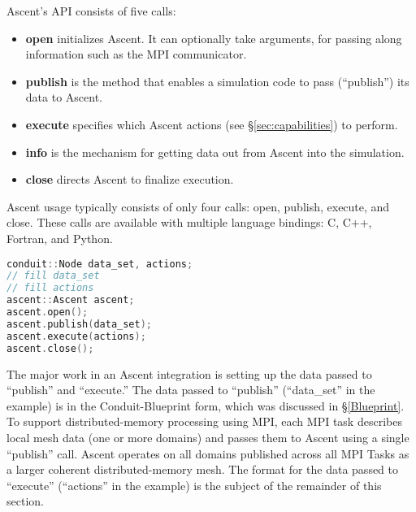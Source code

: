 %

Ascent's API consists of five calls:
%
\begin{itemize}
  \item \textbf{open} initializes Ascent.  It can optionally take arguments, for passing along
information such as the MPI communicator.
%
  \item \textbf{publish} is the method that enables a simulation code to pass (``publish'') its data
to Ascent.  
%
   \item \textbf{execute} specifies which Ascent actions (see \S\ref{sec:capabilities}) to perform.  
%
%
  \item \textbf{info} is the mechanism for getting data out from Ascent into the simulation.
%
%
  \item \textbf{close} directs Ascent to finalize execution.
\end{itemize}

Ascent usage typically consists of only four calls: open, publish, execute, and close.
%
These calls are available with multiple language bindings: C, C++, Fortran, and Python.
%
%
\begin{lstlisting}[language=C++,caption={\label{listing:ascent_api}Typical Ascent usage in C++.
The code for ``fill data\_set'' can be found in Listing~\ref{ex:blueprint}, while the code
for ``fill actions'' can be found in Listing~\ref{listing:actions}.}]
conduit::Node data_set, actions;
// fill data_set 
// fill actions 
ascent::Ascent ascent;
ascent.open();
ascent.publish(data_set);
ascent.execute(actions);
ascent.close();
\end{lstlisting}

The major work in an Ascent integration is setting up the data passed to ``publish'' and
``execute.''
%
The data passed to ``publish'' (``data\_set'' in the example) is in the Conduit-Blueprint form, which was discussed in \S\ref{Blueprint}. To support distributed-memory processing using MPI, each MPI task describes local mesh data (one or more domains) and passes them to Ascent using a single ``publish'' call. Ascent operates on all domains published across all MPI Tasks as a larger coherent distributed-memory mesh. 
%
The format for the data passed to ``execute'' (``actions'' in the example) 
is the subject of the remainder of this section.
%


